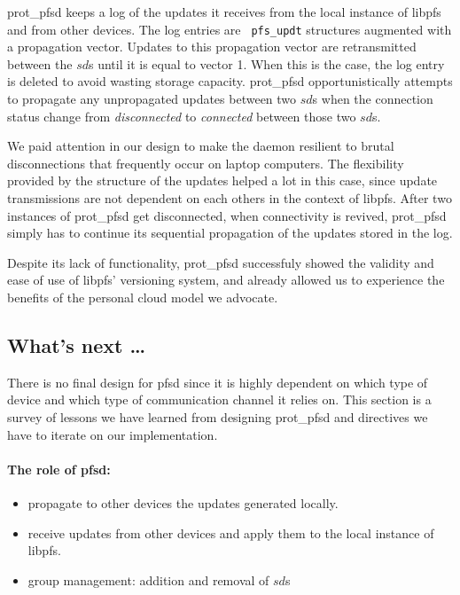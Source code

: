 prot\_pfsd keeps a log of the updates it receives from the local
instance of libpfs and from other devices. The log entries are {\tt
  pfs\_updt} structures augmented with a propagation vector. Updates
to this propagation vector are retransmitted between the $sd$s until it
is equal to vector 1. When this is the case, the log entry is deleted to
avoid wasting storage capacity. prot\_pfsd opportunistically attempts
to propagate any unpropagated updates between two $sd$s when the
connection status change from \emph{disconnected} to \emph{connected}
between those two $sd$s.

We paid attention in our design to make the daemon resilient to brutal
disconnections that frequently occur on laptop computers. The
flexibility provided by the structure of the updates helped a lot in
this case, since update transmissions are not dependent on each
others in the context of libpfs. After two instances of prot\_pfsd get
disconnected, when connectivity is revived, prot\_pfsd simply has
to continue its sequential propagation of the updates stored in the
log.

Despite its lack of functionality, prot\_pfsd successfuly showed
the validity and ease of use of libpfs' versioning system, and already 
allowed us to experience the benefits of the personal cloud model we
advocate.

\subsection {What's next \ldots}
\label {subsec:depfsd}

There is no final design for pfsd since it is highly dependent on
which type of device and which type of communication channel it relies
on. This section is a survey of lessons we have learned from designing
prot\_pfsd and directives we have to iterate on our implementation.

\paragraph {The role of pfsd:}
\begin{itemize}
\item propagate to other devices the updates generated locally.
\item receive updates from other devices and apply them to the local
  instance of libpfs.
\item group management: addition and removal of $sd$s
\end{itemize}

